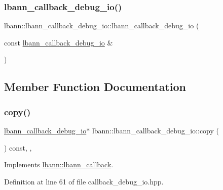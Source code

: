 \subsubsection{\texorpdfstring{lbann\+\_\+callback\+\_\+debug\+\_\+io()}{lbann\_callback\_debug\_io()}\hspace{0.1cm}{\footnotesize\ttfamily [2/2]}}
{\footnotesize\ttfamily lbann\+::lbann\+\_\+callback\+\_\+debug\+\_\+io\+::lbann\+\_\+callback\+\_\+debug\+\_\+io (\begin{DoxyParamCaption}\item[{const \hyperlink{classlbann_1_1lbann__callback__debug__io}{lbann\+\_\+callback\+\_\+debug\+\_\+io} \&}]{ }\end{DoxyParamCaption})\hspace{0.3cm}{\ttfamily [default]}}



\subsection{Member Function Documentation}
\mbox{\label{classlbann_1_1lbann__callback__debug__io_a91fb292d9dff96dbf72ecc16855c4092}} 
\subsubsection{\texorpdfstring{copy()}{copy()}}
{\footnotesize\ttfamily \hyperlink{classlbann_1_1lbann__callback__debug__io}{lbann\+\_\+callback\+\_\+debug\+\_\+io}$\ast$ lbann\+::lbann\+\_\+callback\+\_\+debug\+\_\+io\+::copy (\begin{DoxyParamCaption}{ }\end{DoxyParamCaption}) const\hspace{0.3cm}{\ttfamily [inline]}, {\ttfamily [override]}, {\ttfamily [virtual]}}



Implements \hyperlink{classlbann_1_1lbann__callback_a9f545d1269a8c7af335625d049691f26}{lbann\+::lbann\+\_\+callback}.



Definition at line 61 of file callback\+\_\+debug\+\_\+io.\+hpp.


